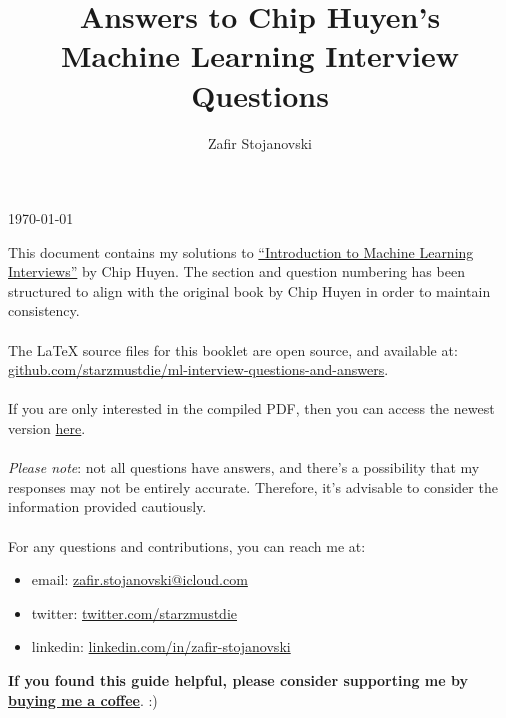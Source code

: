 \documentclass{article}
\title{\Huge Answers to Chip Huyen's \\ Machine Learning Interview Questions}
\author{\Large Zafir Stojanovski}
\date{}
\begin{document}
\maketitle

\thispagestyle{empty} %

\vfill %
\begin{center}
\today
\end{center}

\newpage
\tableofcontents

\setcounter{section}{4}
\newpage

\noindent This document contains my solutions to \href{https://huyenchip.com/ml-interviews-book/}{``Introduction to Machine Learning Interviews''} by Chip Huyen. The section and question numbering has been structured to align with the original book by Chip Huyen in order to maintain consistency.
\\
\\
The \LaTeX \hspace{0.07em} source files for this booklet are open source, and available at: \\ \href{https://github.com/starzmustdie/ml-interview-questions-and-answers}{github.com/starzmustdie/ml-interview-questions-and-answers}. 
\\
\\
If you are only interested in the compiled PDF, then you can access the newest version \href{https://drive.google.com/file/d/1P4w12EvvFG19f4uVsvai6fC93p7kRphE/view?usp=sharing}{here}.
\\
\\
\textit{Please note}: not all questions have answers, and there's a possibility that my responses may not be entirely accurate. Therefore, it's advisable to consider the information provided cautiously.
\\
\\
For any questions and contributions, you can reach me at:
\begin{itemize}
    \item email: \href{mailto:zafir.stojanovski@icloud.com}{zafir.stojanovski@icloud.com}
    \item twitter: \href{https://twitter.com/starzmustdie}{twitter.com/starzmustdie}
    \item linkedin: \href{https://www.linkedin.com/in/zafir-stojanovski/}{linkedin.com/in/zafir-stojanovski}
\end{itemize}
\vspace{2em}
\noindent \textbf{If you found this guide helpful, please consider supporting me by \href{https://www.buymeacoffee.com/starzmustdie}{buying me a coffee}}. :) 
\end{document}
